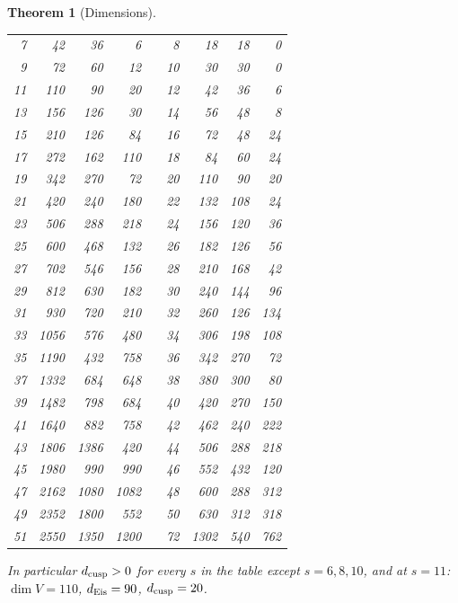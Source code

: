 \documentclass[11pt]{article}
\newtheorem{theorem}{Theorem}[section]
\theoremstyle{definition}
\begin{document}
\begin{theorem}[Dimensions]
\begin{center}
\begin{longtable}{rrrrcrrrr}
7 & 42 & 36 & 6 && 8 & 18 & 18 & 0\\
9 & 72 & 60 & 12 && 10 & 30 & 30 & 0\\
11 & 110 & 90 & 20 && 12 & 42 & 36 & 6\\
13 & 156 & 126 & 30 && 14 & 56 & 48 & 8\\
15 & 210 & 126 & 84 && 16 & 72 & 48 & 24\\
17 & 272 & 162 & 110 && 18 & 84 & 60 & 24\\
19 & 342 & 270 & 72 && 20 & 110 & 90 & 20\\
21 & 420 & 240 & 180 && 22 & 132 & 108 & 24\\
23 & 506 & 288 & 218 && 24 & 156 & 120 & 36\\
25 & 600 & 468 & 132 && 26 & 182 & 126 & 56\\
27 & 702 & 546 & 156 && 28 & 210 & 168 & 42\\
29 & 812 & 630 & 182 && 30 & 240 & 144 & 96\\
31 & 930 & 720 & 210 && 32 & 260 & 126 & 134\\
33 & 1056 & 576 & 480 && 34 & 306 & 198 & 108\\
35 & 1190 & 432 & 758 && 36 & 342 & 270 & 72\\
37 & 1332 & 684 & 648 && 38 & 380 & 300 & 80\\
39 & 1482 & 798 & 684 && 40 & 420 & 270 & 150\\
41 & 1640 & 882 & 758 && 42 & 462 & 240 & 222\\
43 & 1806 & 1386 & 420 && 44 & 506 & 288 & 218\\
45 & 1980 & 990 & 990 && 46 & 552 & 432 & 120\\
47 & 2162 & 1080 & 1082 && 48 & 600 & 288 & 312\\
49 & 2352 & 1800 & 552 && 50 & 630 & 312 & 318\\
51 & 2550 & 1350 & 1200 && 72 & 1302 & 540 & 762\\
\bottomrule
\end{longtable}
\end{center}
In particular $d_{\rm cusp}>0$ for every $s$ in the table except $s=6,8,10$, and at $s=11$: $\dim V=110$, $d_{\rm Eis}=90$, $d_{\rm cusp}=20$.
\end{theorem}
\end{document}
